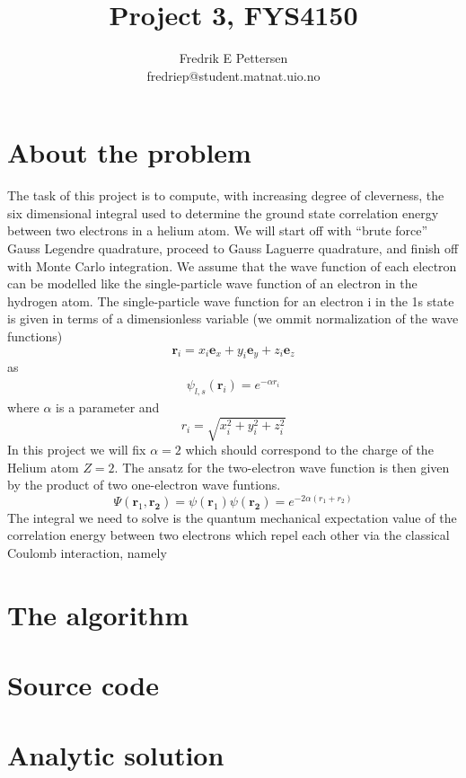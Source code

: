 \documentclass[a4paper,english, 10pt, twoside]{article}
\title{Project 3, FYS4150}
\author{Fredrik E Pettersen\\ fredriep@student.matnat.uio.no}
\begin{document}
\maketitle

\begin{abstract}

\end{abstract}

\section*{About the problem}
The task of this project is to compute, with increasing degree of cleverness, the six dimensional integral used to determine the 
ground state correlation energy between two electrons in a helium atom. We will start off with ``brute force'' Gauss Legendre 
quadrature, proceed to Gauss Laguerre quadrature, and finish off with Monte Carlo integration. We assume that the wave function 
of each electron can be modelled like the single-particle wave function of an electron in the hydrogen atom. The single-particle 
wave function for an electron i in the 1s state is given in terms of a dimensionless variable (we ommit normalization of the wave 
functions)
$$
\mathbf{r}_i = x_i\mathbf{e}_x + y_i\mathbf{e}_y + z_i\mathbf{e}_z
$$
as
\begin{align*}
 \psi_{l,s}(\mathbf{r}_i) = e^{-\alpha r_i}
\end{align*}
where $\alpha$ is a parameter and 
$$
r_i = \sqrt{x_i^2 + y_i^2 + z_i^2}
$$
In this project we will fix $\alpha = 2$ which should correspond to the charge of the Helium atom $Z = 2$.
The ansatz for the two-electron wave function is then given by the product of two one-electron wave funtions.
$$
\Psi(\mathbf{r}_1,\mathbf{r_2}) = \psi(\mathbf{r}_1)\psi(\mathbf{r_2}) = e^{-2\alpha(r_1+r_2)}
$$
The integral we need to solve is the quantum mechanical expectation value of the
correlation energy between two electrons which repel each other via the classical Coulomb
interaction, namely

\section*{The algorithm}
\section*{Source code}
\section*{Analytic solution}
\end{document}
